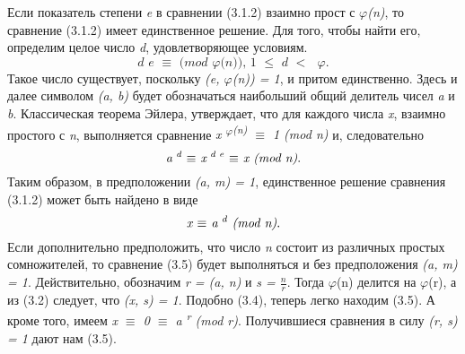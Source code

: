   Если показатель степени \textit{e} в сравнении (3.1.2) взаимно прост с \textit{{$\varphi$}(n)}, то сравнение (3.1.2) имеет единственное решение. 
Для того, чтобы найти его, определим целое число \textit{d}, удовлетворяющее условиям. 
\begin{equation}
 \textit{d e {$\equiv$} (mod {$\varphi$}(n)), 1 {$\leq$} d {$<$} {$\varphi$}}.
\end{equation}
Такое число существует, поскольку \textit{(e, {$\varphi$}(n)) = 1}, и притом единственно. Здесь и далее символом \textit{(a, b)} будет обозначаться 
наибольший общий делитель чисел \textit{a} и \textit{b}. Классическая теорема Эйлера, утверждает, что для каждого числа \textit{x}, взаимно простого 
с \textit{n}, выполняется сравнение \textit{x\textsuperscript{ {$\varphi$}(n)} {$\equiv$} 1 (mod n) } и, следовательно
\begin{equation}
 \textit{a\textsuperscript{ d} {$\equiv$} x\textsuperscript{ d e} {$\equiv$} x (mod n)}.
\end{equation}
Таким образом, в предположении \textit{(a, m) = 1}, единственное решение сравнения (3.1.2) может быть найдено в виде
\begin{equation}
 \textit{x {$\equiv$} a\textsuperscript{ d} (mod n)}.
\end{equation}
Если дополнительно предположить, что число \textit{n} состоит из различных простых сомножителей, то сравнение (3.5) будет выполняться и без 
предположения \textit{(a, m) = 1}. Действительно, обозначим \textit{r = (a, n)} и \textit{s = {$\frac{n}{r}$}}. Тогда {$\varphi$}(n) делится на {$\varphi$}(r), 
а из (3.2) следует, что \textit{(x, s) = 1}. Подобно (3.4), теперь легко находим (3.5). А кроме того, имеем \textit{x {$\equiv$} 0 {$\equiv$} a\textsuperscript{ r} (mod r)}. 
Получившиеся сравнения в силу \textit{(r, s) = 1} дают нам (3.5).

